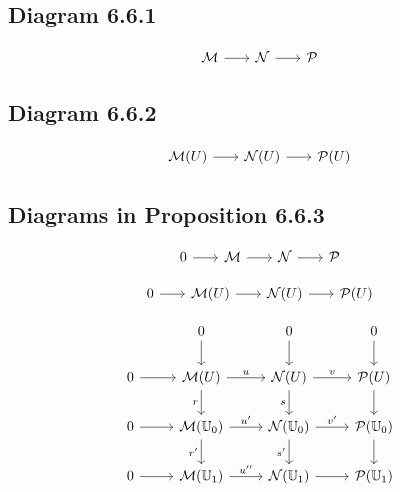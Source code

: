 \documentclass[leqno]{amsart}
\begin{document}
	\subsection*{Diagram 6.6.1}

	\begin{equation*}
		\begin{tikzcd}[sep=scriptsize]
			\mathcal{M} \arrow{r} & \mathcal{N} \arrow{r} & \mathcal{P}
		\end{tikzcd}
	\end{equation*}

	\subsection*{Diagram 6.6.2}

	\begin{equation*}
		\begin{tikzcd}[sep=scriptsize]
			 \mathcal{M}(U) \arrow{r} & \mathcal{N}(U) \arrow{r} & \mathcal{P}(U)
		\end{tikzcd}
	\end{equation*}

	\subsection*{Diagrams in Proposition 6.6.3}

	\begin{equation*}
		\begin{tikzcd}[sep=scriptsize]
			0 \arrow{r} & \mathcal{M} \arrow{r} & \mathcal{N} \arrow{r} & \mathcal{P}
		\end{tikzcd}
	\end{equation*}

	\begin{equation*}
		\begin{tikzcd}[sep=scriptsize]
			0 \arrow{r} & \mathcal{M}(U) \arrow{r} & \mathcal{N}(U) \arrow{r} & \mathcal{P}(U)
		\end{tikzcd}
	\end{equation*}

	\begin{equation*}
		\begin{tikzcd}
			 & 0 \arrow{d} & 0 \arrow{d} & 0 \arrow{d} \\ 
			0 \arrow{r} & \mathcal{M}(U) \arrow{r}{u} \arrow{d}[swap]{r} & \mathcal{N}(U) \arrow{r}{v} \arrow{d}[swap]{s} & \mathcal{P}(U) \arrow{d} \\
			0 \arrow{r} & \mathcal{M}(\mathbb{U}_0) \arrow{r}{u^{\prime}} \arrow{d}[swap]{r^{\prime}} & \mathcal{N}(\mathbb{U}_0) \arrow{r}{v^{\prime}} \arrow{d}[swap]{s^{\prime}} & \mathcal{P}(\mathbb{U}_0) \arrow{d} \\
			0 \arrow{r} & \mathcal{M}(\mathbb{U}_1) \arrow{r}{u^{\prime\prime}} & \mathcal{N}(\mathbb{U}_1) \arrow{r} & \mathcal{P}(\mathbb{U}_1)
		\end{tikzcd}
	\end{equation*}
\end{document}
